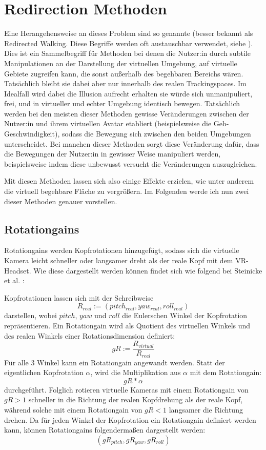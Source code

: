 \section{Redirection Methoden}
Eine Herangehensweise an dieses Problem sind so genannte  (besser bekannt als Redirected Walking. Diese Begriffe werden oft austauschbar verwendet, siehe \cite{redwalk_uebersicht}). Dies ist ein Sammelbegriff für Methoden bei denen die Nutzer:in durch subtile Manipulationen an der Darstellung der virtuellen Umgebung, auf virtuelle Gebiete zugreifen kann, die sonst außerhalb des begehbaren Bereichs wären. Tatsächlich bleibt sie dabei aber nur innerhalb des realen Trackingspaces.
Im Idealfall wird dabei die Illusion aufrecht erhalten sie würde sich unmanipuliert, frei, und in virtueller und echter Umgebung identisch bewegen. Tatsächlich werden bei den meisten dieser Methoden %
gewisse Veränderungen zwischen der Nutzer:in und ihrem virtuellen Avatar etabliert (beispielsweise die Geh-Geschwindigkeit), sodass die Bewegung sich zwischen den beiden Umgebungen unterscheidet.
Bei manchen dieser Methoden sorgt diese Veränderung dafür, dass die Bewegungen der Nutzer:in in gewisser Weise manipuliert werden, beispielsweise indem diese unbewusst versucht die Veränderungen auszugleichen.

Mit diesen Methoden lassen sich also einige Effekte erzielen, wie unter anderem die virtuell begehbare Fläche zu vergrößern.
Im Folgenden werde ich nun zwei dieser Methoden genauer vorstellen.

\subsection{Rotationgains}
Rotationgains werden Kopfrotationen hinzugefügt, sodass sich die virtuelle Kamera leicht schneller oder langsamer dreht als der reale
Kopf mit dem VR-Headset.
Wie diese dargestellt werden können findet sich wie folgend bei Steinicke et al. \cite{detection-thresholds}:

Kopfrotationen lassen sich mit der Schreibweise
$$ R_{real} := (pitch_{real}, yaw_{real}, roll_{real}) $$
darstellen, wobei $pitch$, $yaw$ und $roll$ die Eulerschen Winkel der Kopfrotation repräsentieren. Ein Rotationgain wird als Quotient des virtuellen Winkels und des realen Winkels einer Rotationsdimension definiert:
$$ gR := \frac{R_{virtual}}{R_{real}} $$
Für alle 3 Winkel kann ein Rotationgain angewandt werden.
Statt der eigentlichen Kopfrotation $\alpha$, wird die Multiplikation aus $\alpha$ mit dem Rotationgain:
$$ gR * \alpha $$
durchgeführt.
Folglich rotieren virtuelle Kameras mit einem Rotationgain von $gR > 1$ schneller in die Richtung der realen Kopfdrehung als der reale Kopf, während solche mit einem Rotationgain von $gR < 1$ langsamer die Richtung drehen.
Da für jeden Winkel der Kopfrotation ein Rotationgain definiert werden kann, können Rotationgains folgendermaßen dargestellt werden:
$$(gR_{pitch}, gR_{yaw}, gR_{roll})$$

